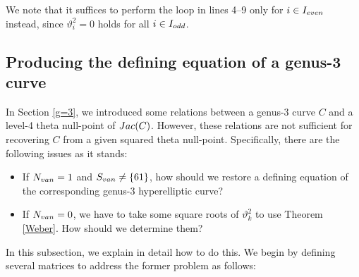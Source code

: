 \documentclass{amsart}
\theoremstyle{definition}
\theoremstyle{plain}
\begin{document}
\noindent We note that it suffices to perform the loop in lines 4--9 only for $i \in I_{\rm even}$ instead, since $\vartheta_i^2 \!= 0$ holds for all $i \in I_{\rm odd}$.

\subsection{Producing the defining equation of a genus-3 curve}\label{restore}
In Section \ref{g=3}, we introduced some relations between a genus-3 curve $C$ and a level-4 theta null-point of ${\rm Jac}(C)$.
However, these relations are not sufficient for recovering $C$ from a given squared theta null-point.
Specifically, there are the following issues as it stands:\smallskip
\begin{itemize}
\item[---] If $N_{\rm van} = 1$ and $S_{\rm van} \neq \{61\}$, how should we restore a defining equation of the corresponding genus-3 hyperelliptic curve?\smallskip
\item[---] If $N_{\rm van} = 0$, we have to take some square roots of $\vartheta_k^2$ to use Theorem \ref{Weber}. How should we determine them?\smallskip
\end{itemize}
\noindent In this subsection, we explain in detail how to do this.
We begin by defining several matrices to address the former problem as follows:
\end{document}
